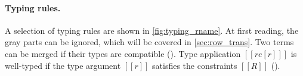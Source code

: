 

\paragraph{Typing rules.}

A selection of typing rules are shown in \cref{fig:typing_rname}. At
first reading, the gray parts can be ignored, which will be covered in
\cref{sec:row_trans}. %
Two terms can be merged if their types are compatible (). Type
application $[[ re [ r ] ]]$ is well-typed if the type argument $[[r]]$
satisfies the constraints $[[R]]$ ().


